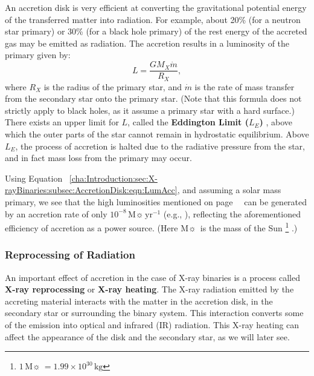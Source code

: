 \vspace{\myparskip}

An accretion disk is very efficient at converting the gravitational potential energy of the transferred matter into radiation. For example, about 20\% (for a neutron star primary) or 30\% (for a
black hole primary) of the rest energy of the accreted gas may be
emitted as radiation. The accretion results in a luminosity of the primary given by:
\begin{equation} \label{cha:Introduction:sec:X-rayBinaries:subsec:AccretionDisk:eqn:LumAcc}
L = \frac{G M_X \dot{m}}{R_X},
\end{equation}
where $R_X$ is the radius of the primary star, and $\dot{m}$ is the
rate of mass transfer from the secondary star onto the primary star. %
(Note that this formula does not strictly apply to black holes, as it assume a
primary star with a hard surface.) %
There exists an upper limit for $L$, called the \textbf{Eddington
Limit ($L_{E}$)}\label{cha:Introduction:sec:BinaryStarSystems:subsec:AccretionDisk:topic:L_E}%
, above which the outer parts of the star cannot remain in hydrostatic
equilibrium. Above $L_{E}$, the process of accretion is halted due to
the radiative pressure from the star, and in fact mass loss from the primary may occur. %

\vspace{\myparskip}

Using Equation~%
\vref{cha:Introduction:sec:X-rayBinaries:subsec:AccretionDisk:eqn:LumAcc}, %
and assuming a solar mass primary, we see
that the high luminosities mentioned on page~%
\pageref{cha:Introduction:sec:X-rayBinaries:subsec:CompactObjects:topic:HighLum}%
\ can be generated by an accretion rate of
only $10^{-8}\,\mathrm{M}\sun\,\mathrm{yr^{-1}}$ (e.g., %
%
), %
reflecting the aforementioned efficiency of accretion as a power
source. (Here $\mathrm{M}\sun$\ is the mass of the Sun%
\footnote{\label{cha:Introduction:sec:X-rayBinaries:foot:Msun}
$1\,\mathrm{M}\sun\ = 1.99 \times 10^{30}\,\mathrm{kg}$}%
.)


\subsubsection{Reprocessing of Radiation}\label{cha:Introduction:sec:X-rayBinaries:subsec:AccretionDisk:subsubsec:ReprocessingOfRadiation}

An important effect of accretion in the case of X-ray binaries is a
process called \textbf{X-ray reprocessing} or \textbf{X-ray heating}. The X-ray radiation emitted by the
accreting material interacts with the matter in the accretion disk, in
the secondary star or surrounding the binary system. This interaction
converts some of the emission into optical and infrared (IR) radiation. This
X-ray heating can affect the appearance of the disk and the secondary
star, as we will later see. %

